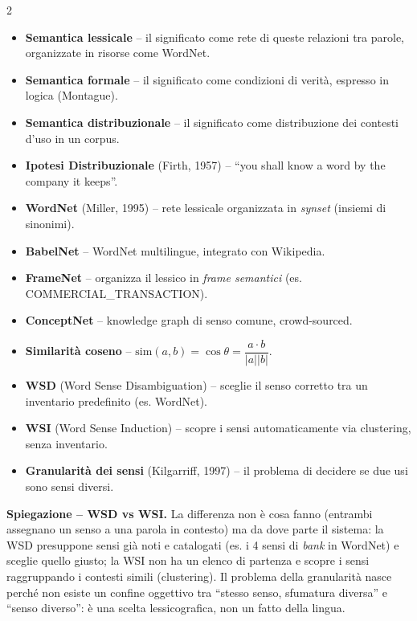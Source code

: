 \documentclass[10pt,a4paper]{extarticle}
\begin{document}
\begin{multicols}{2}
\begin{itemize}
\end{itemize}
\begin{itemize}
\item \textbf{Semantica lessicale} -- il significato come rete di queste relazioni tra parole, organizzate in risorse come WordNet.
\item \textbf{Semantica formale} -- il significato come condizioni di verit\`a, espresso in logica (Montague).
\item \textbf{Semantica distribuzionale} -- il significato come distribuzione dei contesti d'uso in un corpus.
\item \textbf{Ipotesi Distribuzionale} (Firth, 1957) -- ``you shall know a word by the company it keeps''.
\item \textbf{WordNet} (Miller, 1995) -- rete lessicale organizzata in \emph{synset} (insiemi di sinonimi).
\item \textbf{BabelNet} -- WordNet multilingue, integrato con Wikipedia.
\item \textbf{FrameNet} -- organizza il lessico in \emph{frame semantici} (es. COMMERCIAL\_TRANSACTION).
\item \textbf{ConceptNet} -- knowledge graph di senso comune, crowd-sourced.
\item \textbf{Similarit\`a coseno} -- $\mathrm{sim}(a,b)=\cos\theta=\dfrac{a\cdot b}{|a||b|}$.
\item \textbf{WSD} (Word Sense Disambiguation) -- sceglie il senso corretto tra un inventario predefinito (es. WordNet).
\item \textbf{WSI} (Word Sense Induction) -- scopre i sensi automaticamente via clustering, senza inventario.
\item \textbf{Granularit\`a dei sensi} (Kilgarriff, 1997) -- il problema di decidere se due usi sono sensi diversi.
\end{itemize}
\smallskip\noindent\textbf{\textcolor{blue!45!black}{Spiegazione -- WSD vs WSI.}} La differenza non \`e cosa fanno (entrambi assegnano un senso a una parola in contesto) ma da dove parte il sistema: la WSD presuppone sensi gi\`a noti e catalogati (es. i 4 sensi di \emph{bank} in WordNet) e sceglie quello giusto; la WSI non ha un elenco di partenza e scopre i sensi raggruppando i contesti simili (clustering). Il problema della granularit\`a nasce perch\'e non esiste un confine oggettivo tra ``stesso senso, sfumatura diversa'' e ``senso diverso'': \`e una scelta lessicografica, non un fatto della lingua.


\end{multicols}
\end{document}

